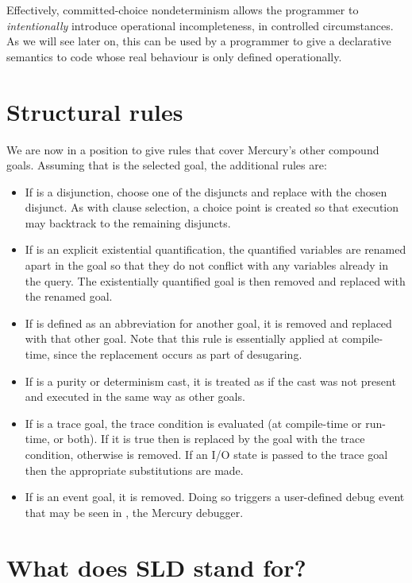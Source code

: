 Effectively,
committed-choice nondeterminism allows the programmer
to \emph{intentionally} introduce operational incompleteness,
in controlled circumstances.
As we will see later on,
this can be used by a programmer
to give a declarative semantics to code
whose real behaviour is only defined operationally.


\section{Structural rules}
\label{sec:structure}

We are now in a position to give rules
that cover Mercury's other compound goals.
Assuming that  is the selected goal,
the additional rules are:

\begin{itemize}
\item
If  is a disjunction,
choose one of the disjuncts
and replace  with the chosen disjunct.
As with clause selection,
a choice point is created so that
execution may backtrack to the remaining disjuncts.
\item
If  is an explicit existential quantification,
the quantified variables are renamed apart in the goal
so that they do not conflict with any variables already in the query.
The existentially quantified goal is then removed
and replaced with the renamed goal.
\item
If  is defined as an abbreviation for another goal,
it is removed and replaced with that other goal.
Note that this rule is essentially applied at compile-time,
since the replacement occurs as part of desugaring.
\item
If  is a purity or determinism cast,
it is treated as if the cast was not present
and executed in the same way as other goals.
\item
If  is a trace goal,
the trace condition is evaluated
(at compile-time or run-time, or both).
If it is true then  is replaced
by the goal with the trace condition,
otherwise  is removed.
If an I/O state is passed to the trace goal
then the appropriate substitutions are made.
\item
If  is an event goal,
it is removed.
Doing so triggers a user-defined debug event
that may be seen in ,
the Mercury debugger.
\end{itemize}


\section{What does SLD stand for?}
\label{sec:sld}

